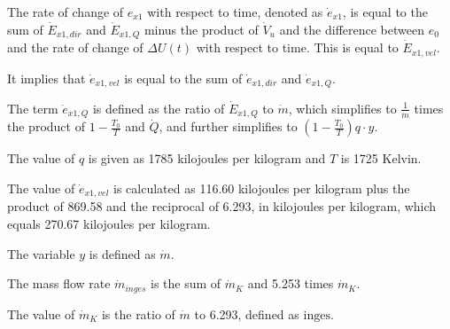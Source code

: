 The rate of change of \( e_{x1} \) with respect to time, denoted as \( \dot{e}_{x1} \), is equal to the sum of \( \dot{E}_{x1,dir} \) and \( \dot{E}_{x1,Q} \) minus the product of \( \dot{V}_u \) and the difference between \( e_0 \) and the rate of change of \( \Delta U(t) \) with respect to time. This is equal to \( \dot{E}_{x1,vel} \).

It implies that \( \dot{e}_{x1,vel} \) is equal to the sum of \( \dot{e}_{x1,dir} \) and \( \dot{e}_{x1,Q} \).

The term \( \dot{e}_{x1,Q} \) is defined as the ratio of \( \dot{E}_{x1,Q} \) to \( \dot{m} \), which simplifies to \( \frac{1}{\dot{m}} \) times the product of \( 1 - \frac{T_0}{T} \) and \( \dot{Q} \), and further simplifies to \( \left( 1 - \frac{T_0}{T} \right) q \cdot y \).

The value of \( q \) is given as 1785 kilojoules per kilogram and \( T \) is 1725 Kelvin.

The value of \( \dot{e}_{x1,vel} \) is calculated as 116.60 kilojoules per kilogram plus the product of 869.58 and the reciprocal of 6.293, in kilojoules per kilogram, which equals 270.67 kilojoules per kilogram.

The variable \( y \) is defined as \( \dot{m} \).

The mass flow rate \( \dot{m}_{inges} \) is the sum of \( \dot{m}_K \) and 5.253 times \( \dot{m}_K \).

The value of \( \dot{m}_K \) is the ratio of \( \dot{m} \) to 6.293, defined as \( \text{inges} \).